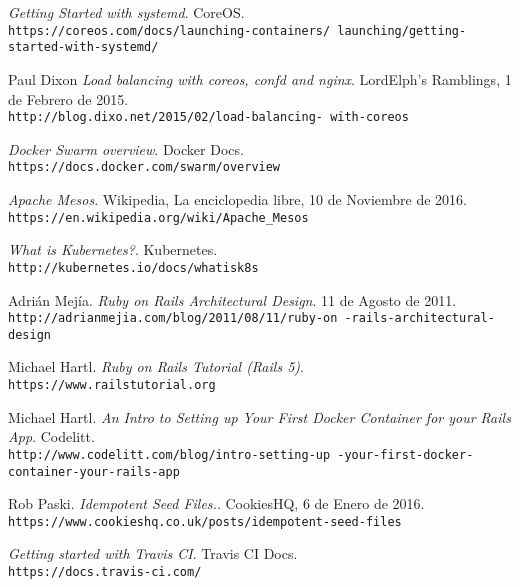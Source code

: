\begin{thebibliography}{9}
\textit{Getting Started with systemd}. 
CoreOS.
\\\texttt{https://coreos.com/docs/launching-containers/
launching/getting-started-with-systemd/}

Paul Dixon
\textit{Load balancing with coreos, confd and nginx}. 
LordElph's Ramblings, 1 de Febrero de 2015.
\\\texttt{http://blog.dixo.net/2015/02/load-balancing-
with-coreos}

\textit{Docker Swarm overview}. 
Docker Docs.
\\\texttt{https://docs.docker.com/swarm/overview}

\textit{Apache Mesos}. 
Wikipedia, La enciclopedia libre, 10 de Noviembre de 2016.
\\\texttt{https://en.wikipedia.org/wiki/Apache\_Mesos}

\textit{What is Kubernetes?}. 
Kubernetes.
\\\texttt{http://kubernetes.io/docs/whatisk8s}

Adrián Mejía.
\textit{Ruby on Rails Architectural Design}. 
11 de Agosto de 2011.
\\\texttt{http://adrianmejia.com/blog/2011/08/11/ruby-on
-rails-architectural-design}

Michael Hartl.
\textit{Ruby on Rails Tutorial (Rails 5)}. 
\\\texttt{https://www.railstutorial.org}

Michael Hartl.
\textit{An Intro to Setting up Your First Docker Container for your Rails App}. 
Codelitt.
\\\texttt{http://www.codelitt.com/blog/intro-setting-up
-your-first-docker-container-your-rails-app}

Rob Paski.
\textit{Idempotent Seed Files.}. 
CookiesHQ, 6 de Enero de 2016.
\\\texttt{https://www.cookieshq.co.uk/posts/idempotent-seed-files}

\textit{Getting started with Travis CI}. 
Travis CI Docs.
\\\texttt{https://docs.travis-ci.com/}

\end{thebibliography}


